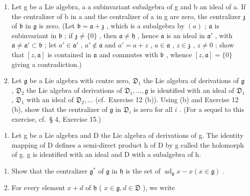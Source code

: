 \begin{enumerate}
\def\labelenumi{(\alph{enumi})}
\setcounter{enumi}{1}
\item
  Let g be a Lie algebra, a a subinvariant subalgebra of g and b an ideal of a. If the centralizer of b in a and the centralizer of a in g are zero, the centralizer \(\mathfrak{z}\) of \(\mathfrak{b}\) in \(\mathfrak{g}\) is zero. (Let \(\mathfrak{b} = \mathfrak{a} + \mathfrak{z}\) , which is a subalgebra by \((a)\) ; \(\mathfrak{a}\) is subinvariant in \(\mathfrak{b}\) ; if \(\mathfrak{z} \neq \{0\}\) , then \(\mathfrak{a} \neq \mathfrak{h}\) , hence \(\mathfrak{a}\) is an ideal in \(\mathfrak{a}'\) , with \(\mathfrak{a} \neq \mathfrak{a}' \subset \mathfrak{b}\) ; let \(a' \in \mathfrak{a}'\) , \(a' \notin \mathfrak{a}\) and \(a' = a + z\) , \(a \in \mathfrak{a}\) , \(z \in \mathfrak{z}\) , \(z \neq 0\) ; show that \([z, \mathfrak{a}]\) is contained in \(\mathfrak{a}\) and commutes with \(\mathfrak{b}\) , whence \([z, \mathfrak{a}] = \{0\}\) giving a contradiction.)
\item
  Let \(\mathfrak{g}\) be a Lie algebra with centre zero, \(\mathfrak{D}_1\) the Lie algebra of derivations of \(\mathfrak{g}\) , \(\mathfrak{D}_2\) the Lie algebra of derivations of \(\mathfrak{D}_1, \ldots, \mathfrak{g}\) is identified with an ideal of \(\mathfrak{D}_1\) , \(\mathfrak{D}_1\) with an ideal of \(\mathfrak{D}_2, \ldots\) (cf.~Exercise 12 (b)). Using (b) and Exercise 12 (b), show that the centralizer of \(\mathfrak{g}\) in \(\mathfrak{D}_i\) is zero for all \(i\) . (For a sequel to this exercise, cf.~§ 4, Exercise 15.)
\end{enumerate}

\begin{enumerate}
\def\labelenumi{\arabic{enumi}.}
\setcounter{enumi}{15}
\tightlist
\item
  Let g be a Lie algebra and D the Lie algebra of derivations of g. The identity mapping of D defines a semi-direct product h of D by g called the holomorph of g. g is identified with an ideal and D with a subalgebra of h.
\end{enumerate}

\begin{enumerate}
\def\labelenumi{(\alph{enumi})}
\item
  Show that the centralizer \(\mathfrak{g}^*\) of \(\mathfrak{g}\) in \(\mathfrak{h}\) is the set of \(\operatorname{ad}_{\mathfrak{g}}x - x(x\in \mathfrak{g})\) .
\item
  For every element \(x + d\) of \(\mathfrak{h}\) ( \(x \in \mathfrak{g}, d \in \mathfrak{D}\) ), we write
\end{enumerate}

